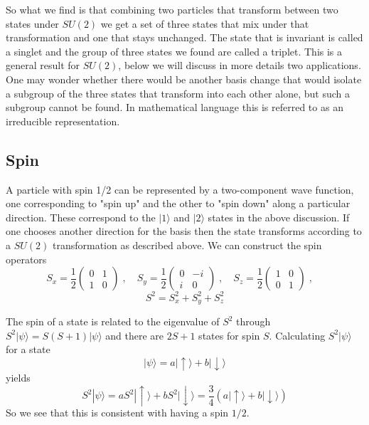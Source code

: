 \documentclass[12pt]{article}
\begin{document}
      So what we find is that combining two particles that transform between two states under $SU(2)$ we get a set of three states that mix under that transformation and one that stays unchanged. The state that is invariant is called a singlet and the group of three states we found are called a triplet. This is a general result for $SU(2)$, below we will discuss in more details two applications. One may wonder whether there would be another basis change that would isolate a subgroup of the three states that transform into each other alone, but such a subgroup cannot be found. In mathematical language this is referred to as an irreducible representation.

      \subsection{Spin}
      A particle with spin 1/2 can be represented by a two-component wave function, one corresponding to "spin up" and the other to "spin down" along a particular direction. These correspond to the $|1\rangle$ and $|2\rangle$ states in the above discussion. If one chooses another direction for the basis then the state transforms according to a $SU(2)$ transformation as described above. We can construct the spin operators
      \[S_x=\frac{1}{2}\left(\begin{array}{cc}0&1\\1&0\end{array}\right)\;,\quad
        S_y=\frac{1}{2}\left(\begin{array}{cc}0&-i\\i&0\end{array}\right)\;,\quad
          S_z=\frac{1}{2}\left(\begin{array}{cc}1&0\\0&1\end{array}\right)\;,\quad\]
            \[            S^2=S_x^2+S_y^2+S_z^2        \]

            The spin of a state is related to the eigenvalue of $S^2$ through $S^2|\psi\rangle=S(S+1)|\psi\rangle$ and there are $2S+1$ states for spin $S$.
            Calculating $S^2|\psi\rangle$ for a state
            \[|\psi\rangle =a|\uparrow\rangle+b|\downarrow\rangle\]
            yields
\[S^2|\psi\rangle =aS^2|\uparrow\rangle+bS^2|\downarrow\rangle=\frac{3}{4}\left(a|\uparrow\rangle+b|\downarrow\rangle\right)\]
            So we see that this is consistent with having a spin $1/2$.
            
\end{document}
